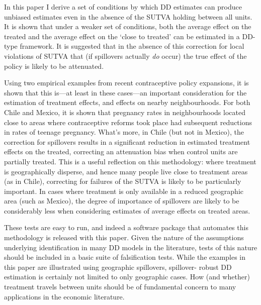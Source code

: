 In this paper I derive a set of conditions by which DD estimates can produce 
unbiased estimates even in the absence of the SUTVA holding between all units.  
It is shown that under a weaker set of conditions, both the average effect on the 
treated and the average effect on the `close to treated' can be estimated in a 
DD-type framework.  It is suggested that in the absence of this correction for 
local violations of SUTVA that (if spillovers actually \emph{do} occur) the true 
effect of the policy is likely to be attenuated.  

Using two empirical examples from recent contraceptive policy expansions, it is 
shown that this is---at least in these cases---an important consideration for 
the estimation of treatment effects, and effects on nearby neighbourhoods.  For
both Chile and Mexico, it is shown that pregnancy rates in neighbourhoods 
located close to areas where contraceptive reforms took place had subsequent
reductions in rates of teenage pregnancy.  What's more, in Chile (but not in 
Mexico), the correction for spillovers results in a significant reduction in
estimated treatment effects on the treated, correcting an attenuation bias when
control units are partially treated.  This is a useful reflection on this 
methodology: where treatment is geographically disperse, and hence many people
live close to treatment areas (as in Chile), correcting for failures of the
SUTVA is likely to be particularly important.  In cases where treatment is only
available in a reduced geographic area (such as Mexico), the degree of
importance of spillovers are likely to be considerably less when considering
estimates of average effects on treated areas.

These tests are easy to run, and indeed a software package that automates this
methodology is released with this paper.  Given the nature of the assumptions
underlying identification in many DD models in the literature, tests of this 
nature should be included in a basic suite of falsification tests.  While the
examples in this paper are illustrated using geographic spillovers, spillover-%
robust DD estimation is certainly not limited to only geographic cases.  How
(and whether) treatment travels between units should be of fundamental concern 
to many applications in the economic literature.


\newpage

\appendix
